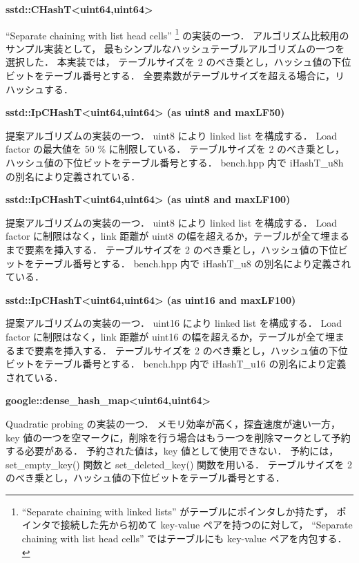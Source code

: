 %
{\bf sstd::CHashT<uint64,uint64>}

``Separate chaining with list head cells''
\footnote{``Separate chaining with linked lists'' がテーブルにポインタしか持たず，
ポインタで接続した先から初めて key-value ペアを持つのに対して，
``Separate chaining with list head cells'' ではテーブルにも key-value ペアを内包する．} の実装の一つ．
アルゴリズム比較用のサンプル実装として，
最もシンプルなハッシュテーブルアルゴリズムの一つを選択した．
本実装では，
テーブルサイズを 2 のべき乗とし，ハッシュ値の下位ビットをテーブル番号とする．
全要素数がテーブルサイズを超える場合に，リハッシュする．
\leavevmode \newline

%
{\bf sstd::IpCHashT<uint64,uint64> (as uint8 and maxLF50)}

提案アルゴリズムの実装の一つ．
uint8 により linked list を構成する．
Load factor の最大値を 50 \% に制限している．
テーブルサイズを 2 のべき乗とし，ハッシュ値の下位ビットをテーブル番号とする．
{\rm bench.hpp} 内で {\rm iHashT\_u8h} の別名により定義されている．
\leavevmode \newline

%
{\bf sstd::IpCHashT<uint64,uint64> (as uint8 and maxLF100)}

提案アルゴリズムの実装の一つ．
uint8 により linked list を構成する．
Load factor に制限はなく，link 距離が uint8 の幅を超えるか，テーブルが全て埋まるまで要素を挿入する．
テーブルサイズを 2 のべき乗とし，ハッシュ値の下位ビットをテーブル番号とする．
{\rm bench.hpp} 内で {\rm iHashT\_u8} の別名により定義されている．
\leavevmode \newline

%
{\bf sstd::IpCHashT<uint64,uint64> (as uint16 and maxLF100)}

提案アルゴリズムの実装の一つ．
uint16 により linked list を構成する．
Load factor に制限はなく，link 距離が uint16 の幅を超えるか，テーブルが全て埋まるまで要素を挿入する．
テーブルサイズを 2 のべき乗とし，ハッシュ値の下位ビットをテーブル番号とする．
{\rm bench.hpp} 内で {\rm iHashT\_u16} の別名により定義されている．
\leavevmode \newline

%
{\bf google::dense\_hash\_map<uint64,uint64>}

Quadratic probing の実装の一つ．
メモリ効率が高く，探査速度が速い一方，
key 値の一つを空マークに，削除を行う場合はもう一つを削除マークとして予約する必要がある．
予約された値は，key 値として使用できない．
予約には，set\_empty\_key() 関数と set\_deleted\_key() 関数を用いる．
テーブルサイズを 2 のべき乗とし，ハッシュ値の下位ビットをテーブル番号とする．
\leavevmode \newline

